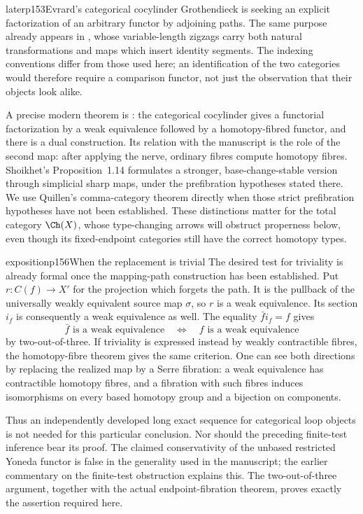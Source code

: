 \begin{dcomment}{later}{p153}{Evrard's categorical cocylinder}
Grothendieck is seeking an explicit factorization of an arbitrary functor by adjoining paths. The same purpose already appears in \citet[\S I.1]{Evrard1975}, whose variable-length zigzags carry both natural transformations and maps which insert identity segments. The indexing conventions differ from those used here; an identification of the two categories would therefore require a comparison functor, not just the observation that their objects look alike.

A precise modern theorem is \citet[Theorem~2.8]{Shoikhet2016}: the categorical cocylinder gives a functorial factorization by a weak equivalence followed by a homotopy-fibred functor, and there is a dual construction. Its relation with the manuscript is the role of the second map: after applying the nerve, ordinary fibres compute homotopy fibres. Shoikhet's Proposition~1.14 formulates a stronger, base-change-stable version through simplicial sharp maps, under the prefibration hypotheses stated there. We use Quillen's comma-category theorem directly when those strict prefibration hypotheses have not been established. These distinctions matter for the total category $\Ch(X)$, whose type-changing arrows will obstruct properness below, even though its fixed-endpoint categories still have the correct homotopy types.
\end{dcomment}

\begin{dcomment}{exposition}{p156}{When the replacement is trivial}
The desired test for triviality is already formal once the mapping-path construction has been established. Put $r:C(f)\to X'$ for the projection which forgets the path. It is the pullback of the universally weakly equivalent source map $\sigma$, so $r$ is a weak equivalence. Its section $i_f$ is consequently a weak equivalence as well. The equality $\bar f i_f=f$ gives
\[
 \bar f\text{ is a weak equivalence}\quad\Longleftrightarrow\quad
 f\text{ is a weak equivalence}
\]
by two-out-of-three. If triviality is expressed instead by weakly contractible fibres, the homotopy-fibre theorem gives the same criterion. One can see both directions by replacing the realized map by a Serre fibration: a weak equivalence has contractible homotopy fibres, and a fibration with such fibres induces isomorphisms on every based homotopy group and a bijection on components.

Thus an independently developed long exact sequence for categorical loop objects is not needed for this particular conclusion. Nor should the preceding finite-test inference bear its proof. The claimed conservativity of the unbased restricted Yoneda functor is false in the generality used in the manuscript; the earlier commentary on the finite-test obstruction explains this. The two-out-of-three argument, together with the actual endpoint-fibration theorem, proves exactly the assertion required here.
\end{dcomment}

